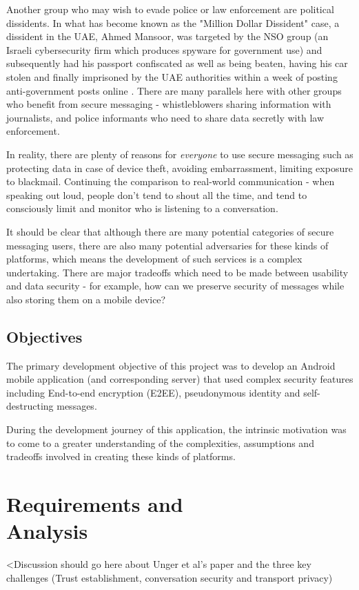 \documentclass{mproj}
\begin{document}
Another group who may wish to evade police or law enforcement are political dissidents. In what has become known as the "Million Dollar Dissident" \cite{marczak2018hide} case, a dissident in the UAE, Ahmed Mansoor, was targeted by the NSO group (an Israeli cybersecurity firm which produces spyware for government use) and subsequently had his passport confiscated as well as being beaten, having his car stolen and finally imprisoned by the UAE authorities within a week of posting anti-government posts online \cite{mazzetti2019new}. There are many parallels here with other groups who benefit from secure messaging - whistleblowers sharing information with journalists, and police informants who need to share data secretly with law enforcement. 

In reality, there are plenty of reasons for \emph{everyone} to use secure messaging such as protecting data in case of device theft, avoiding embarrassment, limiting exposure to blackmail. Continuing the comparison to real-world communication - when speaking out loud, people don't tend to shout all the time, and tend to consciously limit and monitor who is listening to a conversation.

It should be clear that although there are many potential categories of secure messaging users, there are also many potential adversaries for these kinds of platforms, which means the development of such services is a complex undertaking. There are major tradeoffs which need to be made between usability and data security - for example, how can we preserve security of messages while also storing them on a mobile device? 

\section{Objectives}
The primary development objective of this project was to develop an Android mobile application (and corresponding server) that used complex security features including End-to-end encryption (E2EE), pseudonymous identity and self-destructing messages. 

During the development journey of this application, the intrinsic motivation was to come to a greater understanding of the complexities, assumptions and tradeoffs involved in creating these kinds of platforms. 

\chapter{Requirements and \\ Analysis}\label{analysis}
<Discussion should go here about Unger et al's paper and the three key challenges (Trust establishment, conversation security and transport privacy)\cite{unger2015sok}
\end{document}

